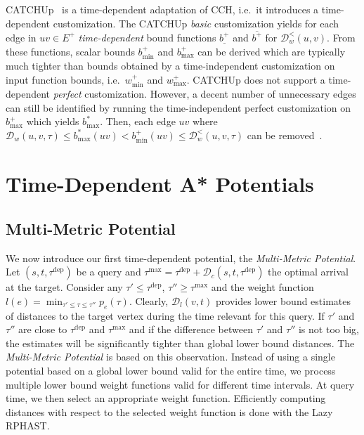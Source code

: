 \documentclass[a4paper,UKenglish,cleveref, autoref, thm-restate,anonymous]{lipics-v2021}
\newcommand*{\pred}{p}
\newcommand*{\dist}{\mathcal{D}}
\newcommand*{\tdep}{\tau^{\operatorname{dep}}}
\newcommand*{\tmax}{\tau^{\max}}
\begin{document}
CATCHUp~\cite{swz-sfert-21} is a time-dependent adaptation of CCH, i.e.\ it introduces a time-dependent customization.
The CATCHUp \emph{basic} customization yields for each edge in $uv \in E^+$ \emph{time-dependent} bound functions $\underline{b^+}$ and $\overline{b^+}$ for $\dist^<_w(u,v)$.
From these functions, scalar bounds $b^+_{\min}$ and $b^+_{\max}$ can be derived which are typically much tighter than bounds obtained by a time-independent customization on input function bounds, i.e.\ $w^+_{\min}$ and $w^+_{\max}$.
CATCHUp does not support a time-dependent \emph{perfect} customization.
However, a decent number of unnecessary edges can still be identified by running the time-independent perfect customization on $b^+_{\max}$ which yields $b^*_{\max}$.
Then, each edge $uv$ where $\dist_w(u,v,\tau) \leq b^*_{\max}(uv) < b^+_{\min}(uv) \leq \dist^<_w(u,v,\tau)$ can be removed~\cite{swz-sfert-21}.


\section{Time-Dependent A* Potentials}

\subsection{Multi-Metric Potential}

We now introduce our first time-dependent potential, the \emph{Multi-Metric Potential}.
Let $(s,t,\tdep)$ be a query and $\tmax = \tdep + \dist_c(s,t,\tdep)$ the optimal arrival at the target.
Consider any $\tau' \leq \tdep$, $\tau'' \geq \tmax$ and the weight function $l(e) = \min_{\tau' \leq \tau \leq \tau''}\pred_e(\tau)$.
Clearly, $\dist_{l}(v,t)$ provides lower bound estimates of distances to the target vertex during the time relevant for this query.
If $\tau'$ and $\tau''$ are close to $\tdep$ and $\tmax$ and if the difference between $\tau'$ and $\tau''$ is not too big, the estimates will be significantly tighter than global lower bound distances.
The \emph{Multi-Metric Potential} is based on this observation.
Instead of using a single potential based on a global lower bound valid for the entire time, we process multiple lower bound weight functions valid for different time intervals.
At query time, we then select an appropriate weight function.
Efficiently computing distances with respect to the selected weight function is done with the Lazy RPHAST.
\end{document}
